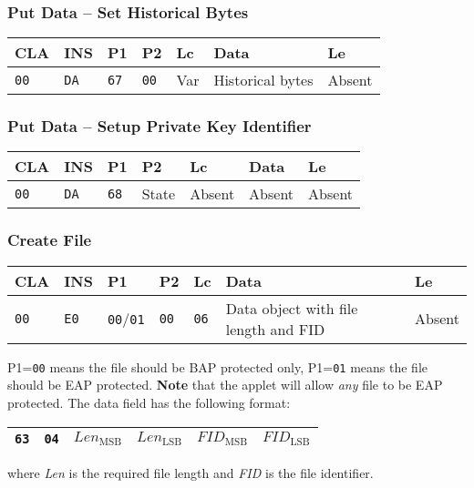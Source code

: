 \documentclass{article}
\begin{document}
\subsubsection{Put Data -- Set Historical Bytes}

\begin{flushleft}
\begin{tabular}{|l|l|l|l|l|l|l|}
\hline
CLA & INS & P1 & P2 & Lc & Data & Le \\
\hline
\texttt{00} & \texttt{DA} & \texttt{67} & \texttt{00} &
Var & Historical bytes & Absent \\
\hline
\end{tabular}
\end{flushleft}

\subsubsection{Put Data -- Setup Private Key Identifier}

\begin{flushleft}
\begin{tabular}{|l|l|l|l|l|l|l|}
\hline
CLA & INS & P1 & P2 & Lc & Data & Le \\
\hline
\texttt{00} & \texttt{DA} & \texttt{68} & State &
Absent & Absent & Absent \\
\hline
\end{tabular}
\end{flushleft}


\subsubsection{Create File}

\begin{flushleft}
\begin{tabular}{|l|l|l|l|l|l|l|}
\hline
CLA & INS & P1 & P2 & Lc & Data & Le \\
\hline
\texttt{00} & \texttt{E0} & \texttt{00}/\texttt{01} & \texttt{00} &
\texttt{06} & Data object with file length and FID  & Absent \\
\hline
\end{tabular}
\end{flushleft}
P1=\texttt{00} means the file should be BAP protected only,
P1=\texttt{01} means the file should be EAP protected. 
\textbf{Note} that the applet will allow \textit{any} file to be EAP protected.
The data field
has the following format:
\begin{flushleft}
\begin{tabular}{|l|l|l|l|l|l|}
\hline
\texttt{63} & \texttt{04} &
$\mathit{Len}_{\mathrm{MSB}}$ & $\mathit{Len}_{\mathrm{LSB}}$ &
$\mathit{FID}_{\mathrm{MSB}}$ & $\mathit{FID}_{\mathrm{LSB}}$ \\
\hline
\end{tabular}
\end{flushleft}
where \textit{Len} is the required file length and \textit{FID} is the
file identifier.
\end{document}
